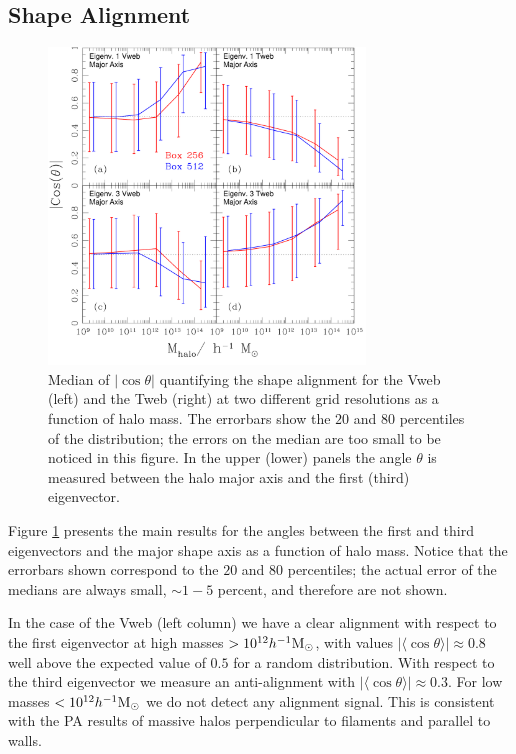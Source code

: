 \documentclass[useAMS,usenatbib]{mn2e}
\newcommand{\hMsun}{{\ifmmode{h^{-1}{\rm
        {M_{\odot}}}}\else{$h^{-1}{\rm{M_{\odot}}}$~}\fi}}
\newcommand{\muavg}{\vert\langle\cos\theta\rangle\vert}
\begin{document}
\subsection{Shape Alignment}

\begin{figure}
\includegraphics[width=0.75\textwidth]{Fig2.pdf}
\caption{Median of $|\cos\theta|$ quantifying the shape alignment for
  the Vweb (left) and the Tweb (right) at two different grid
  resolutions as a function of halo mass.  The errorbars show the $20$ and $80$ percentiles 
  of the distribution; the
  errors on the median are too small to be noticed in this figure. In the upper (lower) panels
  the angle $\theta$ is measured between the halo major axis and the first (third)
  eigenvector.\label{fig:shape_alignment} }
\end{figure}


Figure \ref{fig:shape_alignment} presents the main results for the
angles between the first and third eigenvectors and the major shape
axis as a function of halo mass.  Notice that the errorbars shown correspond
to the $20$ and $80$ percentiles; the actual error of the medians are
always small, $\sim 1-5$ percent, and therefore are not shown.  

In the case of the Vweb (left column) we have a clear alignment with
respect to the first eigenvector at high masses $>10^{12}\hMsun$, with
values $\muavg\approx 0.8$ well above the expected value of $0.5$ for a
random distribution. With respect to the third eigenvector we measure
an anti-alignment with $\muavg\approx0.3$. For low masses
$<10^{12}\hMsun$ we do not detect any alignment signal. This is
consistent with the PA results of massive halos
perpendicular to filaments and parallel to walls.
\end{document}
